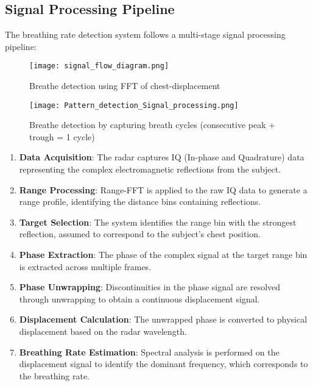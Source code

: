 \documentclass[12pt]{article}
\begin{document}
\subsection{Signal Processing Pipeline}
The breathing rate detection system follows a multi-stage signal processing pipeline:

\begin{figure}[H]
\centering
\begin{minipage}{0.48\textwidth}
  \centering
  \texttt{[image: signal\_flow\_diagram.png]}
  \caption{Breathe detection using FFT of chest-displacement}
\end{minipage}%
\hfill
\begin{minipage}{0.48\textwidth}
  \centering
  \texttt{[image: Pattern\_detection\_Signal\_processing.png]}
  \caption{Breathe detection by capturing breath cycles (consecutive peak + trough = 1 cycle)}
\end{minipage}
\end{figure}

\begin{enumerate}
    \item \textbf{Data Acquisition}: The radar captures IQ (In-phase and Quadrature) data representing the complex electromagnetic reflections from the subject.
    
    \item \textbf{Range Processing}: Range-FFT is applied to the raw IQ data to generate a range profile, identifying the distance bins containing reflections.
    
    \item \textbf{Target Selection}: The system identifies the range bin with the strongest reflection, assumed to correspond to the subject's chest position.
    
    \item \textbf{Phase Extraction}: The phase of the complex signal at the target range bin is extracted across multiple frames.
    
    \item \textbf{Phase Unwrapping}: Discontinuities in the phase signal are resolved through unwrapping to obtain a continuous displacement signal.
    
    \item \textbf{Displacement Calculation}: The unwrapped phase is converted to physical displacement based on the radar wavelength.
    
    \item \textbf{Breathing Rate Estimation}: Spectral analysis is performed on the displacement signal to identify the dominant frequency, which corresponds to the breathing rate.
\end{enumerate}
\end{document}
